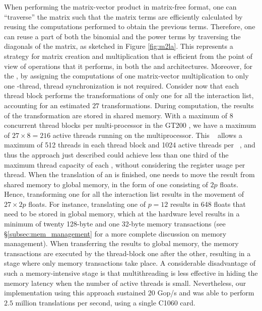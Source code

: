 When performing the matrix-vector product in matrix-free format, one can ``traverse'' the matrix such that the matrix terms are efficiently calculated by reusing the computations performed to obtain the previous terms. Therefore, one can reuse a part of both the binomial and the power terms by traversing the diagonals of the matrix, as sketched in Figure \ref{fig:m2la}.  This represents a strategy for matrix creation and multiplication that is efficient from the point of view of operations that it performs, in both the {\gpu} and {\cpu} architectures.  Moreover, for the {\gpu}, by assigning the computations of one matrix-vector multiplication to only one {\cuda}-thread, thread synchronization is not required. Consider now that each thread block performs the transformations of only one {\ME} for all the interaction list, accounting for an estimated $27$ {\ML} transformations. During computation, the results of the transformation are stored in shared memory. With a maximum  of $8$ concurrent thread blocks per multi-processor in the GT200 \gpu, we have a maximum of $27\times 8=216$ active threads running on the multiprocessor.  This \NV\ {\gpu} allows a maximum of 512 threads in each thread block and 1024 active threads per {\sm}~\cite[][p.\,8]{cuda-guide}, and thus the approach just described could achieve less than one third of the maximum thread capacity of each {\sm}, without considering the register usage per thread. 
When the translation of an {\ME} is finished, one needs to move the result from shared memory to global memory, in the form of one {\LE} consisting of $2p$ floats. Hence, transforming one {\ME} for all the interaction list results in the movement of $27\times 2p$ floats. 
For instance, translating one {\ME} of $p=12$ results in 648 floats that need to be stored in global memory, which at the hardware level results in  a minimum of twenty 128-byte and one 32-byte memory transactions (see \S\ref{subsec:mem_management} for a more complete discussion on memory management). When transferring the results to global memory, the memory transactions are executed by the thread-block one after the other, resulting in a stage where only memory transactions take place. A considerable disadvantage of such a memory-intensive stage is that multithreading is less effective in hiding the  memory latency when the number of active threads is small. 
Nevertheless, our implementation using this approach sustained 20 Gop/s and was able to perform $2.5$ million translations per second, using a single C1060 {\tesla} card. 

